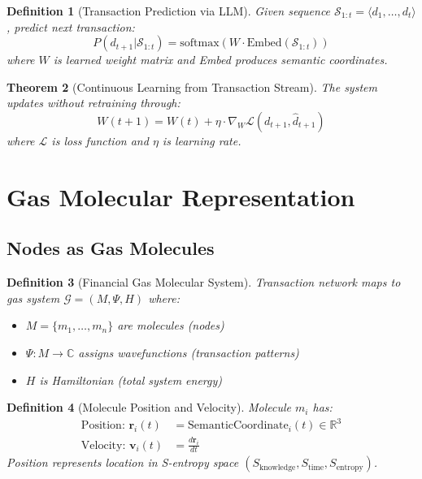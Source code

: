 \documentclass[12pt]{article}
\newtheorem{theorem}{Theorem}
\newtheorem{definition}[theorem]{Definition}
\begin{document}
\begin{definition}[Transaction Prediction via LLM]
Given sequence $\mathcal{S}_{1:t} = \langle d_1, \ldots, d_t \rangle$, predict next transaction:
$$
P(d_{t+1} | \mathcal{S}_{1:t}) = \text{softmax}(W \cdot \text{Embed}(\mathcal{S}_{1:t}))
$$
where $W$ is learned weight matrix and Embed produces semantic coordinates.
\end{definition}

\begin{theorem}[Continuous Learning from Transaction Stream]
The system updates without retraining through:
$$
W(t+1) = W(t) + \eta \cdot \nabla_W \mathcal{L}(d_{t+1}, \hat{d}_{t+1})
$$
where $\mathcal{L}$ is loss function and $\eta$ is learning rate.
\end{theorem}

\section{Gas Molecular Representation}

\subsection{Nodes as Gas Molecules}

\begin{definition}[Financial Gas Molecular System]
Transaction network maps to gas system $\mathcal{G} = (M, \Psi, H)$ where:
\begin{itemize}
    \item $M = \{m_1, \ldots, m_n\}$ are molecules (nodes)
    \item $\Psi: M \to \mathbb{C}$ assigns wavefunctions (transaction patterns)
    \item $H$ is Hamiltonian (total system energy)
\end{itemize}
\end{definition}

\begin{definition}[Molecule Position and Velocity]
Molecule $m_i$ has:
\begin{align}
\text{Position: } \mathbf{r}_i(t) &= \text{SemanticCoordinate}_i(t) \in \mathbb{R}^3 \\
\text{Velocity: } \mathbf{v}_i(t) &= \frac{d\mathbf{r}_i}{dt}
\end{align}
Position represents location in S-entropy space $(S_{\text{knowledge}}, S_{\text{time}}, S_{\text{entropy}})$.
\end{definition}
\end{document}
